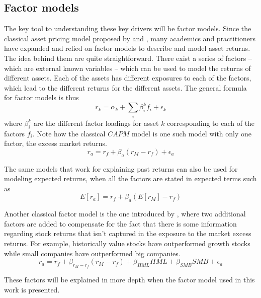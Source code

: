 \subsection{Factor models}
The key tool to understanding these key drivers will be factor models. Since the classical asset pricing model proposed by \cite{sharpe_1964} and \cite{lintner_1975}, many academics and practitioners have expanded and relied on factor models to describe and model asset returns. The idea behind them are quite straightforward. There exist a series of factors -- which are external known variables -- which can be used to model the returns of different assets. Each of the assets has different exposures to each of the factors, which lead to the different returns for the different assets. The general formula for factor models is thus
\begin{equation}
    r_k = \alpha_k + \sum_{i}\beta_i^k f_i + \epsilon_k
\end{equation}
where $\beta_i^k$ are the different factor loadings for asset $k$ corresponding to each of the factors $f_i$. 
Note how the classical $CAPM$ model is one such model with only one factor, the excess market returns. 
\begin{equation}
    r_a=r_f+\beta_a(r_M-r_f) + \epsilon_a    
\end{equation}

The same models that work for explaining past returns can also be used for modeling expected returns, when all the factors are stated in expected terms such as
\begin{equation}
    E\left[r_a\right]=r_f+\beta_a(E\left[r_M\right]-r_f)
\end{equation}

Another classical factor model is the one introduced by \cite{french_1992}, where two additional factors are added to compensate for the fact that there is some information regarding stock returns that isn't captured in the exposure to the market excess returns. For example, historically value stocks have outperformed growth stocks while small companies have outperformed big companies.
\begin{equation}
    r_a=r_f + \beta_{r_M-r_f}(r_M-r_f) + \beta_{HML}HML + \beta_{SMB}SMB + \epsilon_a
\end{equation}

These factors will be explained in more depth when the factor model used in this work is presented. 

